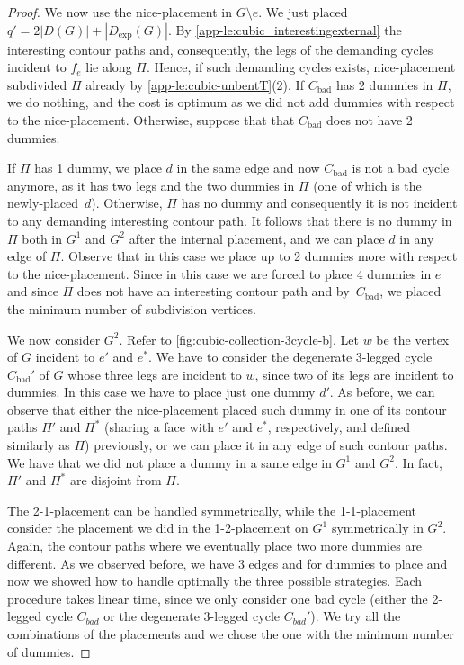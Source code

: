 \documentclass[runningheads]{llncs}
\newcommand{\bad}{\operatorname{bad}}
\begin{document}
\begin{proof}
We now use the nice-placement in $G\setminus e$. We just placed $q'=2|D(G)|+|D_{\exp}(G)|$.
By \cref{app-le:cubic_interestingexternal} the interesting contour paths and, consequently, the legs of the demanding cycles incident to $f_e$ lie along $\Pi$. Hence, if such demanding cycles exists, nice-placement subdivided $\Pi$ already by \cref{app-le:cubic-unbentT}(2). If $C_{\bad}$ has 2 dummies in $\Pi$, we do nothing, and the cost is optimum as we did not add dummies with respect to the nice-placement. Otherwise, suppose that that $C_{\bad}$ does not have 2 dummies. 

If $\Pi$ has 1 dummy, we place $d$ in the same edge and now $C_{\bad}$ is not a bad cycle anymore, as it has two legs and the two dummies in $\Pi$ (one of which is the newly-placed~$d$). 
Otherwise, $\Pi$ has no dummy and consequently it is not incident to any demanding interesting contour path. 
It follows that there is no dummy in $\Pi$ both in $G^1$ and $G^2$ after the internal placement, and we can place $d$ in any edge of $\Pi$. 
Observe that in this case we place up to 2 dummies more with respect to the nice-placement. 
Since in this case we are forced to place 4 dummies in $e$ and since $\Pi$ does not have an interesting contour path and by~$C_{\bad}$, we placed the minimum number of subdivision vertices.

We now consider $G^2$. Refer to \cref{fig:cubic-collection-3cycle-b}. Let $w$ be the vertex of $G$ incident to $e'$ and $e^*$. We have to consider the degenerate 3-legged cycle $C_{\bad}'$ of $G$ whose three legs are incident to $w$, since two of its legs are incident to dummies. In this case we have to place just one dummy $d'$. As before, we can observe that either the nice-placement placed such dummy in one of its contour paths $\Pi'$ and $\Pi^*$ (sharing a face with $e'$ and $e^*$, respectively, and defined similarly as $\Pi$) previously, or we can place it in any edge of such contour paths. We have that we did not  place a dummy in a same edge in $G^1$ and $G^2$. In fact, $\Pi'$ and $\Pi^*$ are disjoint from $\Pi$. 


The 2-1-placement can be handled symmetrically, while the 1-1-placement consider the placement we did in the 1-2-placement on $G^1$ symmetrically in $G^2$. Again, the contour paths where we eventually place two more dummies are different. As we observed before, we have 3 edges and for dummies to place and now we showed how to handle optimally the three possible strategies. Each procedure takes linear time, since we only consider one bad cycle (either the 2-legged cycle $C_{bad}$ or the degenerate 3-legged cycle $C_{bad}'$). We try all the combinations of the placements and we chose the one with the minimum number of dummies.



\end{proof}
\end{document}

